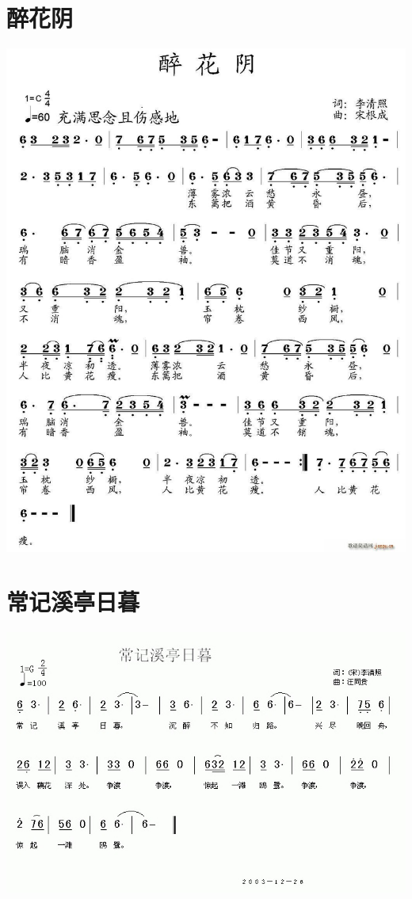 \documentclass[cn,pad,twocol]{elegantbook}
\begin{document}
\section{醉花阴}        \includegraphics[width=\textwidth]{dongxiao/20200808-醉花阴-李清照.jpg} 
\section{常记溪亭日暮}  \includegraphics[width=\textwidth]{dongxiao/20200808-常记溪亭日暮-李清照.jpg}
\end{document}
